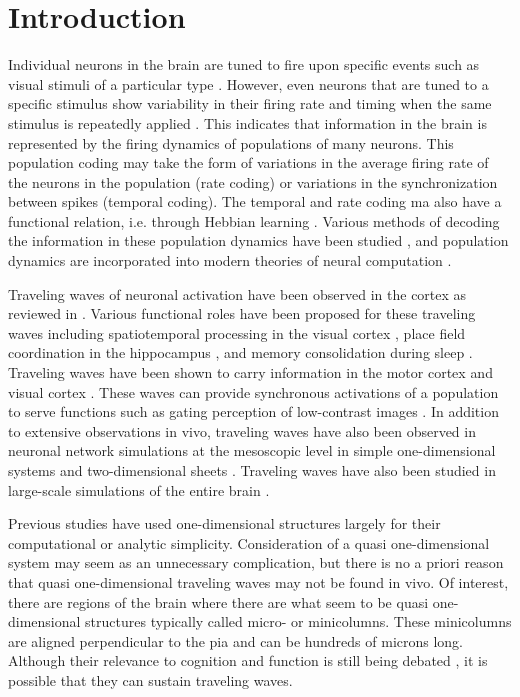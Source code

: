 \documentclass[12pt]{article}
\begin{document}
\section{Introduction} 
Individual neurons in the brain are tuned to fire upon specific events such as visual stimuli of a particular type \parencite{Hubel1962} .
However, even neurons that are tuned to a specific stimulus show variability in their firing rate and timing when the same stimulus is repeatedly applied \parencite{Georgopoulos1982}\parencite{Newsome1989}.
This indicates that information in the brain is represented by the firing dynamics of populations of many neurons.
This population coding may take the form of variations in the average firing rate of the neurons in the population (rate coding) or variations in the synchronization between spikes (temporal coding).
The temporal and rate coding ma also have a functional relation, i.e. through Hebbian learning \parencite{Basawaraj2019}.
Various methods of decoding the information in these population dynamics have been studied \parencite{Deneve1999}\parencite{Xu2019}, and population dynamics are incorporated into modern theories of neural computation \parencite{Pitkow2017}\parencite{Nadeau2020}.

Traveling waves of neuronal activation have been observed in the cortex as reviewed in \parencite{Muller2018}.
Various functional roles have been proposed for these traveling waves including spatiotemporal processing in the visual cortex \parencite{wu2008}\parencite{Muller2014}, place field coordination in the hippocampus \parencite{lubernov2009}, and memory consolidation during sleep \parencite{Dickey2021}.
Traveling waves have been shown to carry information in the  motor cortex \parencite{Rubino2006} and visual cortex \parencite{Besserve2015}.
These waves can provide synchronous activations of a population to serve functions such as gating perception of low-contrast images \parencite{Davis2020}.
In addition to extensive observations in vivo, traveling waves have also been observed in neuronal network simulations at the mesoscopic level in simple one-dimensional systems \parencite{Wilson1973}\parencite{Golomb1999} and two-dimensional sheets \parencite{keane2015}.
Traveling waves have also been studied in large-scale simulations of the entire brain \parencite{Roberts2019}.

Previous studies have used one-dimensional structures largely for their computational or analytic simplicity. 
Consideration of a quasi one-dimensional system may seem as an unnecessary complication, but there is no a priori reason that quasi one-dimensional traveling waves may not be found in vivo.
Of interest, there are regions of the brain where there are what seem to be quasi one-dimensional structures \parencite{mountcastle1997}\parencite{Cruz2009} typically called micro- or minicolumns. 
These minicolumns are aligned perpendicular to the pia and can be hundreds of microns long.  
Although their relevance to cognition and function is still being debated \parencite{horton2005}\parencite{buxhoeveden2002}, it is possible that they can sustain traveling waves.
\end{document}
